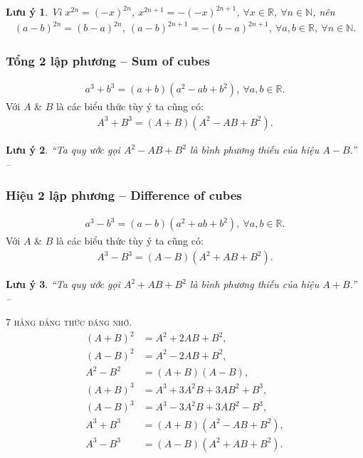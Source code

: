 \documentclass{article}
\numberwithin{equation}{section}
\newtheorem{luuy}{Lưu ý}[section]
\begin{document}
\begin{luuy}
	Vì $x^{2n} = (-x)^{2n}$, $x^{2n + 1} = -(-x)^{2n + 1}$, $\forall x\in\mathbb{R}$, $\forall n\in\mathbb{N}$, nên
	\begin{align*}
		(a - b)^{2n} = (b - a)^{2n},\ (a - b)^{2n + 1} = -(b - a)^{2n + 1},\ \forall a,b\in\mathbb{R},\ \forall n\in\mathbb{N}.
	\end{align*}
\end{luuy}

\subsubsection{Tổng 2 lập phương -- Sum of cubes}
\begin{align}
	\label{sum of cubes}
	a^3 + b^3 = (a + b)(a^2 - ab + b^2),\ \forall a,b\in\mathbb{R}.
\end{align}
Với $A$ \& $B$ là các biểu thức tùy ý ta cũng có:
\begin{align*}
	A^3 + B^3 = (A + B)(A^2 - AB + B^2).
\end{align*}

\begin{luuy}
	``Ta quy ước gọi $A^2 - AB + B^2$ là \emph{bình phương thiếu của hiệu $A - B$}.'' -- \cite[p. 15]{SGK_Toan_8_tap_1}
\end{luuy}

\subsubsection{Hiệu 2 lập phương -- Difference of cubes}
\begin{align}
	\label{sum of cubes}
	a^3 - b^3 = (a - b)(a^2 + ab + b^2),\ \forall a,b\in\mathbb{R}.
\end{align}
Với $A$ \& $B$ là các biểu thức tùy ý ta cũng có:
\begin{align*}
	A^3 - B^3 = (A - B)(A^2 + AB + B^2).
\end{align*}

\begin{luuy}
	``Ta quy ước gọi $A^2 + AB + B^2$ là \emph{bình phương thiếu của hiệu $A + B$}.'' -- \cite[p. 15]{SGK_Toan_8_tap_1}
\end{luuy}

\begin{tcolorbox}
	\centering
	\textsc{7 hằng đẳng thức đáng nhớ.}
	\begin{align*}
			(A + B)^2 &= A^2 + 2AB + B^2,\\
			(A - B)^2 &= A^2 - 2AB + B^2,\\
			A^2 - B^2 &= (A + B)(A - B),\\
			(A + B)^3 &= A^3 + 3A^2B + 3AB^2 + B^3,\\
			(A - B)^3 &= A^3 - 3A^2B + 3AB^2 - B^3,\\
			A^3 + B^3 &= (A + B)(A^2 - AB + B^2),\\
			A^3 - B^3 &= (A - B)(A^2 + AB + B^2).
	\end{align*}
\end{tcolorbox}
\end{document}
